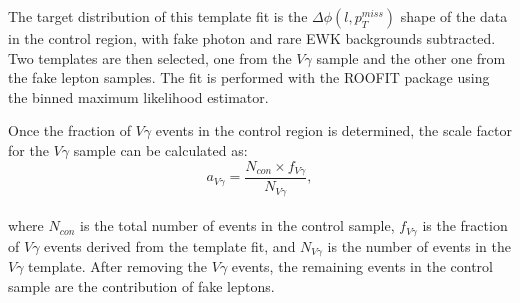 \documentclass[thesis.tex]{subfiles}
\renewcommand\_{\textunderscore\allowbreak}
\begin{document}
The target distribution of this template fit is the $\Delta\phi(l,p_{T}^{miss})$ shape of the data in the control region, with fake photon and rare EWK backgrounds subtracted. Two templates are then selected, one from the $V\gamma$ sample and the other one from the fake lepton samples. The fit is performed with the ROOFIT package using the binned maximum likelihood estimator.

Once the fraction of $V\gamma$ events in the control region is determined, the scale factor for the $V\gamma$ sample can be calculated as: 
\begin{equation}
 		a_{V\gamma} = \frac{N_{con}\times f_{V\gamma}}{N_{V\gamma}}, 
\end{equation}\\
where $N_{con}$ is the total number of events in the control sample, $f_{V\gamma}$ is the fraction of $V\gamma$ events derived from the template fit, and $N_{V\gamma}$ is the number of events in the $V\gamma$ template. After removing the $V\gamma$ events, the remaining events in the control sample are the contribution of fake leptons. 

\end{document}
